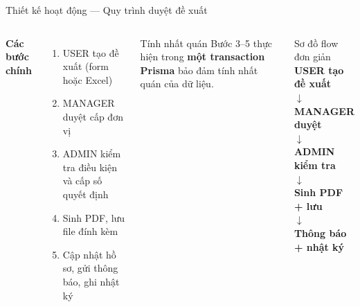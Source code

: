 \documentclass[aspectratio=43,xcolor=table]{beamer}
\begin{document}
\begin{frame}{Thiết kế hoạt động --- Quy trình duyệt đề xuất}
  \begin{columns}[T,onlytextwidth]
    \textbf{Các bước chính}\\[0.2cm]
    \footnotesize
    \begin{enumerate}
      \item USER tạo đề xuất (form hoặc Excel)
      \item MANAGER duyệt cấp đơn vị
      \item ADMIN kiểm tra điều kiện và cấp số quyết định
      \item Sinh PDF, lưu file đính kèm
      \item Cập nhật hồ sơ, gửi thông báo, ghi nhật ký
    \end{enumerate}
    \vspace{0.2cm}
    \begin{block}{Tính nhất quán}
      \scriptsize Bước 3--5 thực hiện trong \textbf{một transaction Prisma} bảo đảm tính nhất quán của dữ liệu.
    \end{block}

    \begin{block}{Sơ đồ flow đơn giản}
      \scriptsize\centering
      \textbf{USER tạo đề xuất}\\
      $\downarrow$\\
      \textbf{MANAGER duyệt}\\
      $\downarrow$\\
      \textbf{ADMIN kiểm tra}\\
      $\downarrow$\\
      \textbf{Sinh PDF + lưu}\\
      $\downarrow$\\
      \textbf{Thông báo + nhật ký}
    \end{block}
  \end{columns}
\end{frame}
\end{document}

